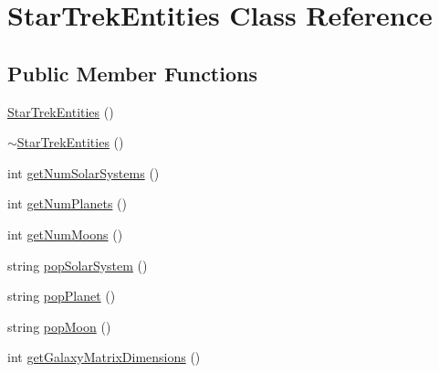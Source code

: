 \hypertarget{classStarTrekEntities}{
\section{StarTrekEntities Class Reference}
\label{d0/ddd/classStarTrekEntities}
}
\subsection*{Public Member Functions}
\begin{DoxyCompactItemize}
\item 
\hyperlink{classStarTrekEntities_a4a3c862c9806b9e83320b081e0616c6c}{StarTrekEntities} ()
\item 
\hyperlink{classStarTrekEntities_aa4d1ff02e0102df2b73fc738fc90dab6}{$\sim$StarTrekEntities} ()
\item 
int \hyperlink{classStarTrekEntities_a937db9741fb8f38114688efd88afa9e5}{getNumSolarSystems} ()
\item 
int \hyperlink{classStarTrekEntities_afcb1218c877dba40bc716ea0166f2e59}{getNumPlanets} ()
\item 
int \hyperlink{classStarTrekEntities_ae468b9e190fc493ad359eb9617c36b3d}{getNumMoons} ()
\item 
string \hyperlink{classStarTrekEntities_a3c0cc386ad82f31b06067a11fd153d9b}{popSolarSystem} ()
\item 
string \hyperlink{classStarTrekEntities_ad620c5f963bc9206f7d234f7f7a318aa}{popPlanet} ()
\item 
string \hyperlink{classStarTrekEntities_a66715667564191e7c863422c78b18403}{popMoon} ()
\item 
int \hyperlink{classStarTrekEntities_aed82ad39e2c5376ff8c0b5ced385c664}{getGalaxyMatrixDimensions} ()
\end{DoxyCompactItemize}


